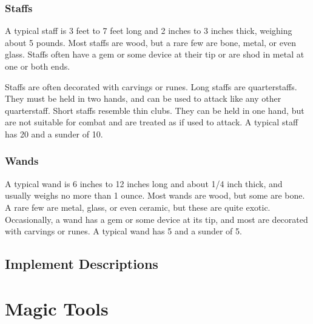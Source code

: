         \subsubsection{Staffs}

             A typical staff is 3 feet to 7 feet long and 2 inches to 3 inches thick, weighing about 5 pounds.
            Most staffs are wood, but a rare few are bone, metal, or even glass.
            Staffs often have a gem or some device at their tip or are shod in metal at one or both ends.

            Staffs are often decorated with carvings or runes.
            Long staffs are quarterstaffs.
            They must be held in two hands, and can be used to attack like any other quarterstaff.
            Short staffs resemble thin clubs.
            They can be held in one hand, but are not suitable for combat and are treated as  if used to attack.
            A typical staff has 20  and a sunder  of 10.

        \subsubsection{Wands}

             A typical wand is 6 inches to 12 inches long and about 1/4 inch thick, and usually weighs no more than 1 ounce.
            Most wands are wood, but some are bone.
            A rare few are metal, glass, or even ceramic, but these are quite exotic.
            Occasionally, a wand has a gem or some device at its tip, and most are decorated with carvings or runes.
            A typical wand has 5  and a sunder  of 5.

    \subsection{Implement Descriptions}

        

        

\section{Magic Tools}

    

